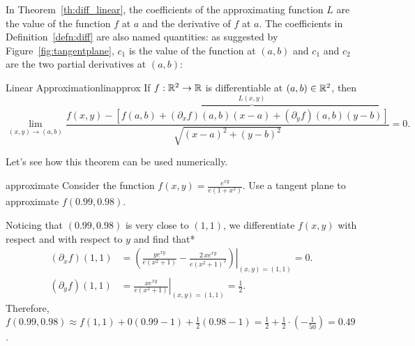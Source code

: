 \documentclass[svgnames]{watsonbook}
\begin{document}
  In Theorem~\ref{th:diff_linear}, the coefficients of the
  approximating function $L$ are the value of the function $f$ at $a$
  and the derivative of $f$ at $a$. The coefficients in
  Definition~\ref{defn:diff} are also named quantities: as suggested
  by Figure~\ref{fig:tangentplane}, $c_1$ is the value of the function
  at $(a,b)$ and $c_1$ and $c_2$ are the two partial derivatives at
  $(a,b)$:

  \vspace{12pt} 

  \begin{theo}{Linear Approximation}{linapprox}
    If $f: \mathbb{R}^2 \to \mathbb{R}$ is differentiable at $(a,b) \in \mathbb{R}^2$, then
    \[
      \lim_{(x,y) \to (a,b)}\frac{f(x,y) - \overbrace{\left[f(a,b) + (\partial_x
        f)(a,b)(x-a) + (\partial_y
        f)(a,b)(y-b)\right]}^{L(x,y)}}{\sqrt{(x-a)^2 + (y-b)^2}} = 0.
    \]
  \end{theo}

  Let's see how this theorem can be used numerically. 

  \begin{example}{}{approximate}
    Consider the function $f(x,y) = \frac{e^{xy}}{e(1+x^2)}$. Use a
    tangent plane to approximate $f(0.99,0.98)$.
  \end{example}

  \begin{solution}
    Noticing that $(0.99,0.98)$ is very close to $(1,1)$, we
    differentiate $f(x,y)$ with respect and with respect to $y$ and
    find that* 
    \begin{align*}
      (\partial_x f)(1,1) &= \left.\left(
                            \frac{y e^{x y}}{e(x^{2} + 1)} -
                            \frac{2 \, x e^{xy}}{{e\left(x^{2} +
                            1\right)}^{2}}\right)\right|_{(x,y)
                            =(1,1)} = 0. \\
      (\partial_y f)(1,1) &=    \left.\frac{x e^{x y}}{e(x^{2} +
                            1)}\right|_{(x,y) = (1,1)} = \frac{1}{2}. 
    \end{align*}
    Therefore, $f(0.99,0.98) \approx f(1,1) + 0(0.99-1) +
    \frac{1}{2}(0.98-1) = \frac{1}{2} + \frac{1}{2} \cdot
    (-\frac{1}{50}) = 0.49$.  
  \end{solution}
  
\end{document}
